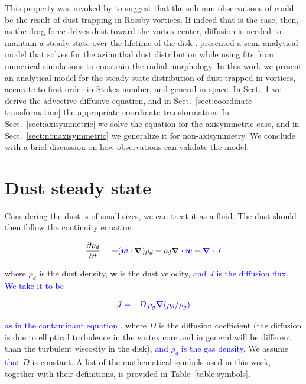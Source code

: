 \documentclass[apj]{emulateapj}
\newcommand{\pderiv}[2]{\frac{\partial #1}{\partial #2}}
\renewcommand{\v}[1]{{\boldsymbol{#1}}} %
\def\blue#1{\textcolor{blue}{ #1}}
\newcommand{\del}{\v{\nabla}}
\newcommand{\grad}{\del}
\newcommand{\Div}{\del\cdot}
\newcommand{\sect}[1]{Sect.~\ref{#1}}
\newcommand{\beq}{\begin{equation}}
\newcommand{\eeq}{\end{equation}}
\begin{document}
This property was invoked by \citet{Regaly12} to suggest that the 
sub-mm observations of \citet{Brown09} could be the result of dust
trapping in Rossby vortices. If indeed that is the case, then, 
as the drag force drives dust toward the vortex center, diffusion is
needed to maintain a steady state over the lifetime of the disk
\citep{Klahr-Henning97,Chavanis00}. \citet{Birnstiel13} presented a semi-analytical model that solves for the azimuthal dust 
distribution while using fits from numerical simulations
\citep{Pinilla12b} to constrain the radial morphology. In this work we present an analytical 
model for the steady state distribution of dust trapped in vortices, 
accurate to first order in Stokes number, and general in space. In 
\sect{sect:model-equations} we derive the
advective-diffusive equation, and in \sect{sect:coordinate-transformation} the appropriate coordinate
transformation. In \sect{sect:axisymmetric} we solve the equation for the axisymmetric
case, and in \sect{sect:nonaxisymmetric} we generalize it for non-axisymmetry. We conclude
with a brief discussion on how observations can validate the model. 

\section{Dust steady state} 
\label{sect:model-equations}

Considering the dust is of small sizes, we can treat it as a
fluid. The dust should then follow the continuity equation 

\beq
  \pderiv{\rho_d}{t} = -(\v{\blue{w}}\cdot\del)\rho_d - \rho_d \Div{\v{\blue{w}}} - \blue{\Div{J}}
  \label{eq:continuity-w}
\eeq

\noindent where $\rho_d$ is the dust density, $\v{w}$ is the dust
velocity, \blue{and $J$ is the diffusion flux. We take it to be}
 
\beq 
\blue{J=-D\,\rho_g\grad{\left(\rho_d/\rho_g\right)}}\label{eq:j-flux}
\eeq 

\noindent \blue{as in the contaminant equation
\citep{Morfill-Volk84,Clarke-Pringle88,Charnoz11},} where $D$ is the  
diffusion coefficient (the diffusion is due
to elliptical turbulence in the vortex core and in general will be
different than the turbulent viscosity in the disk), \blue{and $\rho_g$ is
the gas density}. We assume \blue{that} $D$ is constant. A list of the mathematical symbols used in this work, together
with their definitions, is provided in Table~\ref{table:symbols}. 
\end{document}
